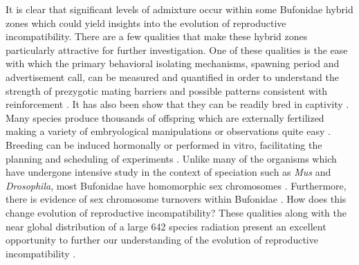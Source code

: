 It is clear that significant levels of admixture occur within some Bufonidae 
hybrid zones which could yield insights into the evolution of reproductive incompatibility. 
There are a few qualities that make these hybrid zones particularly attractive for further investigation.
One of these qualities is the ease with which the primary behavioral isolating mechanisms, 
spawning period and advertisement call, can be measured and quantified in order 
to understand the strength of prezygotic mating barriers and possible patterns 
consistent with reinforcement \parencite{cocroft1995,blair1974,kennedy1962}.
It has also been show that they can be readily bred in captivity \parencite{blair1972}. 
Many species produce thousands of offspring which are externally fertilized  
making a variety of embryological manipulations or observations quite easy \parencite{blair1972}.
Breeding can be induced hormonally or performed in vitro, facilitating the 
planning and scheduling of experiments \parencite{trudeau2010}.
Unlike many of the organisms which have undergone intensive study in the context 
of speciation such as \textit{Mus} and \textit{Drosophila}, most Bufonidae
have homomorphic sex chromosomes \parencite{blair1972}.  
Furthermore, there is evidence of sex chromosome turnovers within Bufonidae \parencite{dufresnes2020,stock2011}. 
How does this change evolution of reproductive incompatibility?
These qualities along with the near global distribution of a large 642 species  
radiation present an excellent opportunity to further our understanding of the 
evolution of reproductive incompatibility \parencite{amphibiaweb2023} .


